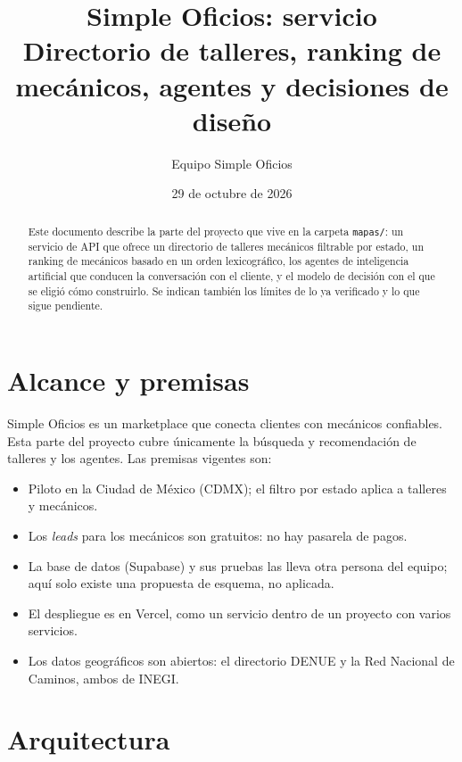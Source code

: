 \documentclass[11pt,a4paper]{article}
\title{Simple Oficios: servicio \code{mapas}\\[2pt]
\large Directorio de talleres, ranking de mecánicos, agentes y decisiones de diseño}
\author{Equipo Simple Oficios}
\date{29 de octubre de 2026}
\newcommand{\code}[1]{\texttt{#1}}
\begin{document}
\maketitle

\begin{abstract}
Este documento describe la parte del proyecto que vive en la carpeta \code{mapas/}: un servicio
de API que ofrece un directorio de talleres mecánicos filtrable por estado, un ranking de
mecánicos basado en un orden lexicográfico, los agentes de inteligencia artificial que conducen
la conversación con el cliente, y el modelo de decisión con el que se eligió cómo construirlo.
Se indican también los límites de lo ya verificado y lo que sigue pendiente.
\end{abstract}

\tableofcontents

\section{Alcance y premisas}

Simple Oficios es un marketplace que conecta clientes con mecánicos confiables. Esta parte del
proyecto cubre únicamente la búsqueda y recomendación de talleres y los agentes. Las premisas
vigentes son:

\begin{itemize}[nosep]
  \item Piloto en la Ciudad de México (CDMX); el filtro por estado aplica a talleres y mecánicos.
  \item Los \emph{leads} para los mecánicos son gratuitos: no hay pasarela de pagos.
  \item La base de datos (Supabase) y sus pruebas las lleva otra persona del equipo; aquí solo
        existe una propuesta de esquema, no aplicada.
  \item El despliegue es en Vercel, como un servicio dentro de un proyecto con varios servicios.
  \item Los datos geográficos son abiertos: el directorio DENUE y la Red Nacional de Caminos, ambos de INEGI.
\end{itemize}

\section{Arquitectura}
\end{document}

